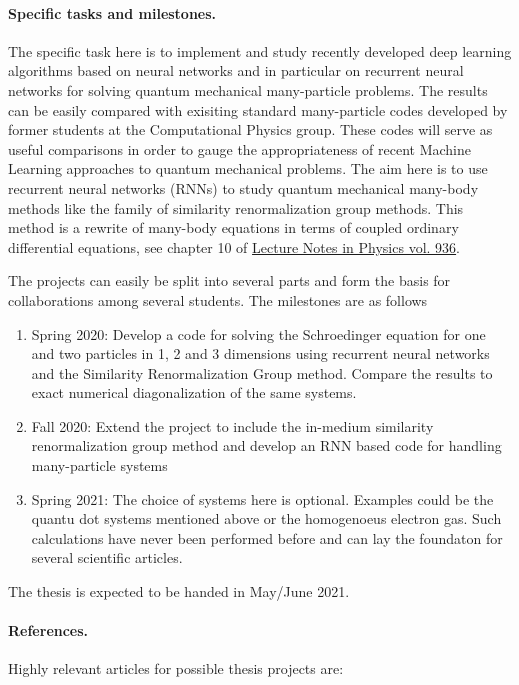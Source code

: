 \documentclass[%
oneside,                 %
final,                   %
10pt]{article}
\begin{document}
\paragraph{Specific tasks and milestones.}
The specific task here is to implement and study recently developed
deep learning algorithms based on neural networks and in particular on
recurrent neural networks for solving quantum mechanical many-particle
problems. The results can be easily compared with exisiting standard
many-particle codes developed by former students at the Computational
Physics group. These codes will serve as useful comparisons in order
to gauge the appropriateness of recent Machine Learning approaches to
quantum mechanical problems.  The aim here is to use recurrent neural
networks (RNNs) to study quantum mechanical many-body methods like the family
of similarity renormalization group methods.  This method is a rewrite
of many-body equations in terms of coupled ordinary differential
equations, see chapter 10 of \href{{https://www.springer.com/gp/book/9783319533353}}{Lecture Notes in Physics
vol. 936}.



The projects can easily be split into several parts and form the basis
for collaborations among several students. The milestones are as
follows

\begin{enumerate}
\item Spring 2020: Develop a code for solving the Schroedinger equation for one and two particles in 1, 2 and 3 dimensions using recurrent neural networks and the Similarity Renormalization Group method. Compare the results to exact numerical diagonalization of the same systems.

\item Fall 2020: Extend the project to include the in-medium similarity renormalization group method and develop an RNN based code for handling many-particle systems

\item Spring 2021: The choice of systems here is optional. Examples could be the quantu dot systems mentioned above or the homogenoeus electron gas. Such calculations have never been performed before and can lay the foundaton for several scientific articles.
\end{enumerate}

\noindent
The thesis is expected to be handed in May/June  2021.

\paragraph{References.}
Highly relevant articles for possible thesis projects are:
\end{document}
